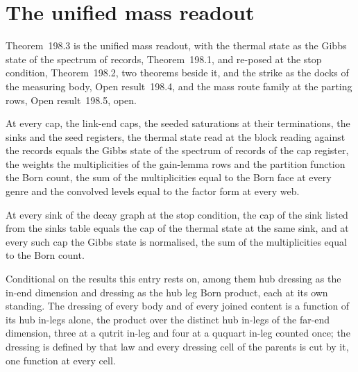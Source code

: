\par\medskip{}\label{narr:close:8-4}\par
\section{The unified mass readout}\label{mod:VIII-5-unified-mass-readout}
\label{narr:open:8-5}Theorem~198.3 is the unified mass readout, with the thermal state as the Gibbs state of the spectrum of records, Theorem~198.1, and re-posed at the stop condition, Theorem~198.2, two theorems beside it, and the strike as the docks of the measuring body, Open result~198.4, and the mass route family at the parting rows, Open result~198.5, open.
\begin{chtheorem}\label{box:VIII-5-unified-mass-readout:1}
At every cap, the link-end caps, the seeded saturations at their terminations, the sinks and the seed registers, the thermal state read at the block reading against the records equals the Gibbs state of the spectrum of records of the cap register, the weights the multiplicities of the gain-lemma rows and the partition function the Born count, the sum of the multiplicities equal to the Born face at every genre and the convolved levels equal to the factor form at every web.
\end{chtheorem}
\begin{chtheorem}\label{box:VIII-5-unified-mass-readout:2}
At every sink of the decay graph at the stop condition, the cap of the sink listed from the sinks table equals the cap of the thermal state at the same sink, and at every such cap the Gibbs state is normalised, the sum of the multiplicities equal to the Born count.
\end{chtheorem}
\begin{chconditional}\label{box:VIII-5-unified-mass-readout:3}
Conditional on the results this entry rests on, among them hub dressing as the in-end dimension and dressing as the hub leg Born product, each at its own standing. The dressing of every body and of every joined content is a function of its hub in-legs alone, the product over the distinct hub in-legs of the far-end dimension, three at a qutrit in-leg and four at a ququart in-leg counted once; the dressing is defined by that law and every dressing cell of the parents is cut by it, one function at every cell.
\end{chconditional}
